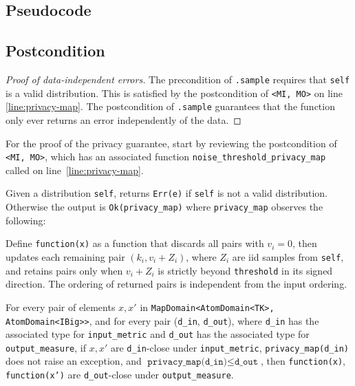 \documentclass{article}
\begin{document}
\subsection*{Pseudocode}


\subsection*{Postcondition}
\begin{theorem}
\end{theorem}

\begin{proof}[Proof of data-independent errors]
    The precondition of \texttt{.sample} requires that \texttt{self} is a valid distribution.
    This is satisfied by the postcondition of \texttt{<MI, MO>} on line \ref{line:privacy-map}.
    The postcondition of \texttt{.sample} guarantees that the function only ever returns an error independently of the data.
\end{proof}

For the proof of the privacy guarantee, start by reviewing the postcondition of \texttt{<MI, MO>},
which has an associated function \texttt{noise\_threshold\_privacy\_map} called on line~\ref{line:privacy-map}.
\begin{lemma}
    \label{lemma:new-privacy-map}
    Given a distribution \texttt{self},
    returns \texttt{Err(e)} if \texttt{self} is not a valid distribution.
    Otherwise the output is \texttt{Ok(privacy\_map)}
    where \texttt{privacy\_map} observes the following:

    Define \texttt{function(x)} as a function that discards all pairs with $v_i = 0$,
    then updates each remaining pair $(k_i, v_i + Z_i)$,
    where $Z_i$ are iid samples from \texttt{self},
    and retains pairs only when $v_i + Z_i$ is strictly beyond \texttt{threshold} in its signed direction.
    The ordering of returned pairs is independent from the input ordering.

    For every pair of elements $x, x'$ in \texttt{MapDomain<AtomDomain<TK>, AtomDomain<IBig>{}>},
    and for every pair (\texttt{d\_in}, \texttt{d\_out}),
    where \texttt{d\_in} has the associated type for \texttt{input\_metric} and \texttt{d\_out} has the associated type for \texttt{output\_measure},
    if $x, x'$ are \texttt{d\_in}-close under \texttt{input\_metric}, \texttt{privacy\_map(d\_in)} does not raise an exception,
    and $\texttt{privacy\_map(d\_in)} \leq \texttt{d\_out}$,
    then \texttt{function(x)}, \texttt{function(x')} are \texttt{d\_out}-close under \texttt{output\_measure}.
\end{lemma}
\end{document}
